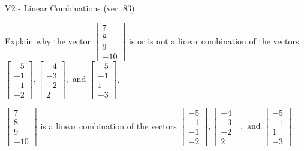 \begin{exercise}
  \begin{exerciseTitle}V2 - Linear Combinations (ver. 83)\end{exerciseTitle}
  \begin{exerciseStatement}
    Explain why the vector \(\left[\begin{array}{c}
7 \\
8 \\
9 \\
-10
\end{array}\right]\)  is or is not a linear 
	combination of the vectors \(\left[\begin{array}{c}
-5 \\
-1 \\
-1 \\
-2
\end{array}\right] , \left[\begin{array}{c}
-4 \\
-3 \\
-2 \\
2
\end{array}\right] , \text{ and } \left[\begin{array}{c}
-5 \\
-1 \\
1 \\
-3
\end{array}\right]\).
	


  \end{exerciseStatement}
  \begin{exerciseAnswer}
   \(\left[\begin{array}{c}
7 \\
8 \\
9 \\
-10
\end{array}\right]\) 
  	 is  
	a linear combination of the vectors \(\left[\begin{array}{c}
-5 \\
-1 \\
-1 \\
-2
\end{array}\right] , \left[\begin{array}{c}
-4 \\
-3 \\
-2 \\
2
\end{array}\right] , \text{ and } \left[\begin{array}{c}
-5 \\
-1 \\
1 \\
-3
\end{array}\right]\).

	
  


  \end{exerciseAnswer}
\end{exercise}